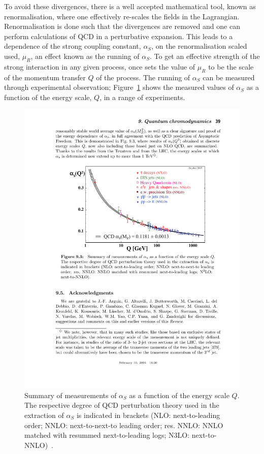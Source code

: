 To avoid these divergences, there is a well accepted mathematical tool, known as renormalisation,
where one effectively re-scales the fields in the Lagrangian.
Renormalisation is done such that the divergences are removed
and one can perform calculations of QCD in a perturbative expansion.
This leads to a dependence of the strong coupling constant, $\alpha_S$, on the renormalisation scaled used, $\mu_R$,
an effect known as the running of $\alpha_S$.
To get an effective strength of the strong interaction in any given process,
once sets the value of $\mu_R$ to be the scale of the momentum transfer $Q$ of the process.
The running of $\alpha_S$ can be measured through experimental observation;
Figure~\ref{fig:theo-qcd_running} shows the measured values of $\alpha_S$
as a function of the energy scale, $Q$, in a range of experiments.

\begin{figure}[!hbt]
  \begin{center}
    \includegraphics[width=0.7\linewidth, angle=0]{figs/Theory/qcd_running.pdf}
  \end{center}
  \caption[Summary of measurements of $\alpha_S$ as a function of the energy scale $Q$.
    The respective degree of QCD perturbation theory used in the extraction of $\alpha_S$ is indicated in brackets
    (NLO: next-to-leading order; NNLO: next-to-next-to leading order; res. NNLO: NNLO matched with resummed next-to-leading logs; N3LO: next-to-NNLO).]
          {Summary of measurements of $\alpha_S$ as a function of the energy scale $Q$.
            The respective degree of QCD perturbation theory used in the extraction of $\alpha_S$ is indicated in brackets
            (NLO: next-to-leading order; NNLO: next-to-next-to leading order; res. NNLO: NNLO matched with resummed next-to-leading logs; N3LO: next-to-NNLO)~\cite{theo-qcd}.}
  \label{fig:theo-qcd_running}
\end{figure}

